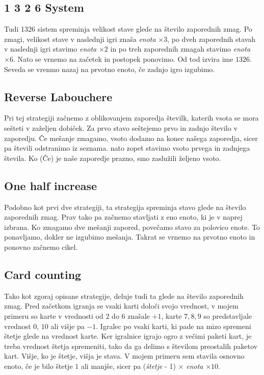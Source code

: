 \documentclass[a4paper, 16pt]{article}
\begin{document}
\subsection{1 3 2 6 System}
Tudi 1326 sistem spreminja velikost stave glede na število zaporednih zmag. Po zmagi, velikost stave v naslednji igri znaša \textit{enota} $\times 3$, po dveh zaporednih stavah v naslednji igri stavimo \textit{enota} $\times 2$ in po treh zaporednih zmagah stavimo \textit{enota} $\times 6$. Nato se vrnemo na začetek in postopek ponovimo. Od tod izvira ime $1326$. Seveda se vrenmo nazaj na prvotno enoto, če zadnjo igro izgubimo.

\subsection{Reverse Labouchere}
Pri tej strategiji začnemo z oblikovanjem zaporedja številk, katerih vsota se mora sešteti v zaželjen dobiček. Za prvo stavo seštejemo prvo in zadnjo število v zaporedju. Če mešanje zmagamo, vsoto dodamo na konec našega zaporedja, sicer pa števili odstranimo iz seznama. nato zopet stavimo vsoto prvega in zadnjega števila. Ko (Če) je naše zaporedje prazno, smo zaslužili željeno vsoto.

\subsection{One half increase}
Podobno kot prvi dve strategiji, ta strategija spreminja stavo glede na število zaporednih zmag. Prav tako pa začnemo stavljati z eno enoto, ki je v naprej izbrana. Ko zmagamo dve mešanji zapored, povečamo stavo za polovico enote. To ponavljamo, dokler ne izgubimo mešanja. Takrat se vrnemo na prvotno enoto in ponovno začnemo cikel.

\subsection{Card counting}
Tako kot zgoraj opisane strategije,  deluje tudi ta glede na število zaporednih zmag. Pred začetkom igranja se vsaki karti določi svojo vrednost, v mojem primeru so karte v vrednosti od $2$ do $6$ znašale $+1$, karte $7, 8, 9$ so predstavljale vrednost 0, $10$ ali višje pa $-1$. Igralec po vsaki karti, ki pade na mizo spremeni štetje glede na vrednost karte. Ker igralnice igrajo ogro z večimi paketi kart, je treba vrednost štetja spremeniti, tako da ga delimo s številom preostalih paketov kart.  Višje, ko je štetje, višja je stava. V mojem primeru sem stavila osnovno enoto, če je bilo štetje $1$ ali manjše, sicer pa (\textit{štetje} - 1) $\times$ \textit{enota} $\times 10$. %
\end{document}
